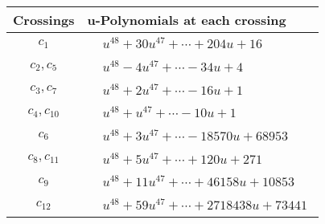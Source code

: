 \documentclass[1p]{elsarticle_modified}
\theoremstyle{definition}
\begin{document}
\begin{tabular}{m{50pt}|m{274pt}}
Crossings & \hspace{64pt}u-Polynomials at each crossing \\
\hline $$\begin{aligned}c_{1}\end{aligned}$$&$\begin{aligned}
&u^{48}+30 u^{47}+\cdots+204 u+16
\end{aligned}$\\
\hline $$\begin{aligned}c_{2},c_{5}\end{aligned}$$&$\begin{aligned}
&u^{48}-4 u^{47}+\cdots-34 u+4
\end{aligned}$\\
\hline $$\begin{aligned}c_{3},c_{7}\end{aligned}$$&$\begin{aligned}
&u^{48}+2 u^{47}+\cdots-16 u+1
\end{aligned}$\\
\hline $$\begin{aligned}c_{4},c_{10}\end{aligned}$$&$\begin{aligned}
&u^{48}+u^{47}+\cdots-10 u+1
\end{aligned}$\\
\hline $$\begin{aligned}c_{6}\end{aligned}$$&$\begin{aligned}
&u^{48}+3 u^{47}+\cdots-18570 u+68953
\end{aligned}$\\
\hline $$\begin{aligned}c_{8},c_{11}\end{aligned}$$&$\begin{aligned}
&u^{48}+5 u^{47}+\cdots+120 u+271
\end{aligned}$\\
\hline $$\begin{aligned}c_{9}\end{aligned}$$&$\begin{aligned}
&u^{48}+11 u^{47}+\cdots+46158 u+10853
\end{aligned}$\\
\hline $$\begin{aligned}c_{12}\end{aligned}$$&$\begin{aligned}
&u^{48}+59 u^{47}+\cdots+2718438 u+73441
\end{aligned}$\\
\hline
\end{tabular}\\~\\
\end{document}
